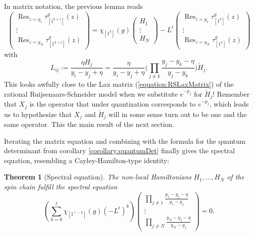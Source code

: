 \documentclass[11pt]{report}
\newtheorem{theorem}{Theorem}[section]
\theoremstyle{definition}
\theoremstyle{remark}
\theoremstyle{remark}
\begin{document}
In matrix notation, the previous lemma reads
\begin{equation*}
\begin{pmatrix}
\operatorname{Res}_{z=y_1} \tau_{[1^{k+1}]}^g(z) \\
\vdots \\
\operatorname{Res}_{z=y_N} \tau_{[1^{k+1}]}^g(z)
\end{pmatrix}
=
\chi_{[1^k]}(g)
\begin{pmatrix}
H_1 \\
\vdots \\
H_N
\end{pmatrix}
-L^t
\begin{pmatrix}
\operatorname{Res}_{z=y_1} \tau_{[1^k]}^g(z) \\
\vdots \\
\operatorname{Res}_{z=y_N} \tau_{[1^k]}^g(z)
\end{pmatrix}
\end{equation*}
with
\begin{equation*}
L_{ij} := \frac{\eta H_j}{y_i-y_j+\eta} = \frac{\eta}{y_i-y_j+\eta} \bigg( \prod_{j \neq k} \frac{y_j-y_k-\eta}{y_j-y_k} \bigg) \check H_j.
\end{equation*}
This looks awfully close to the Lax matrix (\ref{equation:RSLaxMatrix}) of the rational Ruijsenaars-Schneider model when we substitute $e^{-p_j}$ for $\check H_j$! Remember that $X_j$ is the operator that under quantization corresponds to $e^{-p_j}$, which leads us to hypothesize that $X_j$ and $\check H_j$ will in some sense turn out to be one and the same operator. This the main result of the next section.

Iterating the matrix equation and combining with the formula for the quantum determinant from corollary \ref{corollary:quantumDet} finally gives the spectral equation, resembling a Cayley-Hamilton-type identity:

\begin{theorem}[Spectral equation]\label{theorem:spectralEq}
The non-local Hamiltonians $H_1,...,H_N$ of the spin chain fulfill the \emph{spectral equation}
\begin{equation*}
\left( \sum_{k=0}^\ell \chi_{[1^{\ell-k}]}(g) (-L^t)^k \right)
\begin{pmatrix}
\prod_{j \neq 1} \frac{y_1-y_j-\eta}{y_1-y_j} \\
\vdots \\
\prod_{j \neq N} \frac{y_N-y_j-\eta}{y_N-y_j}
\end{pmatrix}
= 0.
\end{equation*}
\end{theorem}
\end{document}
